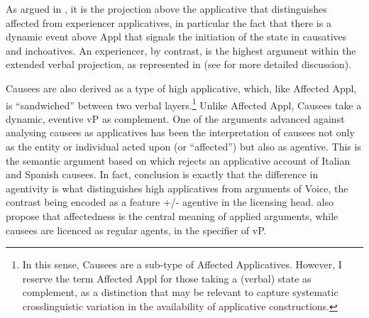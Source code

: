 \documentclass[output=paper,colorlinks,citecolor=brown,nonflat]{./langscibook}
\begin{document}
As argued in , it is the projection above the applicative that distinguishes affected from experiencer applicatives, in particular the fact that there is a dynamic event above Appl that signals the initiation of the state in causatives and inchoatives. An experiencer, by contrast, is the highest argument within the extended verbal projection, as represented in  (see  for more detailed discussion).  

Causees are also derived as a type of high applicative, which, like Affected Appl, is “sandwiched” between two verbal layers.\footnote{In this sense, Causees are a sub-type of Affected Applicatives. However, I reserve the term Affected Appl for those taking a (verbal) state as complement, as a distinction that may be relevant to capture systematic crosslinguistic variation in the availability of applicative constructions.}  Unlike Affected Appl, Causees take a dynamic, eventive vP as complement. One of the arguments advanced against analysing causees as applicatives has been the interpretation of causees not only as the entity or individual acted upon (or “affected”) but also as agentive. This is the semantic argument based on which \citet{Tubino2012} rejects an applicative account of Italian and Spanish causees. In fact,  conclusion is exactly that the difference in agentivity is what distinguishes high applicatives from arguments of Voice, the contrast being encoded as a feature +/- agentive in the licensing head. \citet{BonehNash2011WCCFL} also propose that affectedness is the central meaning of applied arguments, while causees are licenced as regular agents, in the specifier of vP. 
\end{document}
